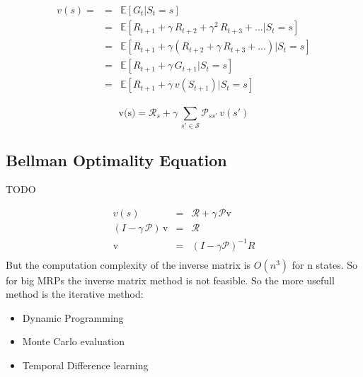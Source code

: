 \begin{itemize}
\begin{eqnarray*}
    v(s) = &=& \mathbb{E}[G_{t}|S_t=s]\\
    &=& \mathbb{E}[R_{t+1} + \gamma\,R_{t+2}+\gamma^2\,R_{t+3}+\ldots|S_t=s]\\
    &=& \mathbb{E}[R_{t+1} + \gamma(R_{t+2}+\gamma\,R_{t+3}+\ldots)|S_t=s]\\
    &=& \mathbb{E}[R_{t+1} + \gamma\,G_{t+1}|S_t=s]\\
    &=& \mathbb{E}[R_{t+1} + \gamma\,v(S_{t+1})|S_t=s]
\end{eqnarray*}

\begin{center}
\end{center}

\[
    \text{v(s)} = \mathcal{R}_{s} + \gamma\,\sum_{s'\in\mathcal{S}}^{}\mathcal{P}_{ss'}\,v(s')
\]

\subsection{Bellman Optimality Equation}\label{subsec:bellman-optimality-equation}
TODO

\begin{eqnarray*}
    v(s) &=& \mathcal{R}+\gamma\,\mathcal{P}\text{v}\\
    (I - \gamma\,\mathcal{P})\,\text{v} &=& \mathcal{R}\\
    \text{v} &=& (I-\gamma\mathcal{P})^{-1} R\\
\end{eqnarray*}
But the computation complexity of the inverse matrix is $O(n^3)$ for n states.
So for big MRPs the inverse matrix method is not feasible.
So the more usefull method is the iterative method:
\begin{itemize}
    \item Dynamic Programming
    \item Monte Carlo evaluation
    \item Temporal Difference learning
\end{itemize}



\end{itemize}
